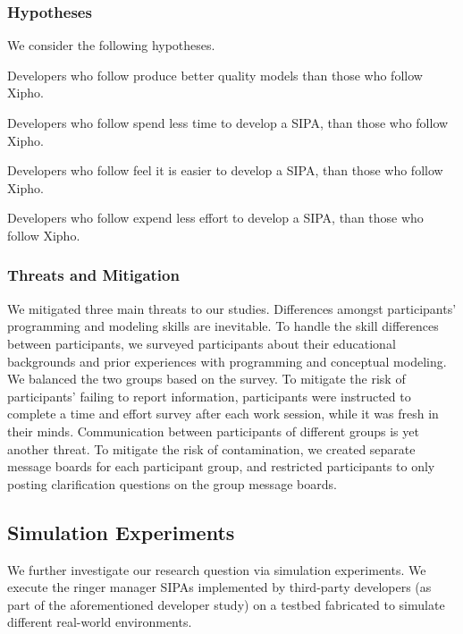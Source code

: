 \subsubsection*{Hypotheses}

We consider the following hypotheses.

\bhypothesis

\item Developers who follow \frameworkA produce better quality models 
than those who follow Xipho.  

\item Developers who follow \frameworkA spend less time to develop 
a SIPA, than those who follow Xipho.

\item Developers who follow \frameworkA feel it is easier to develop 
a SIPA, than those who follow Xipho.

\item Developers who follow \frameworkA expend less effort to develop 
a SIPA, than those who follow Xipho.

\ehypothesis

\subsubsection*{Threats and Mitigation}

We mitigated three main threats to our studies. Differences amongst
participants' programming and modeling skills are inevitable. To handle
the skill differences between participants, we surveyed participants
about their educational backgrounds and prior experiences with
programming and conceptual modeling. We balanced the two groups based on
the survey. To mitigate the risk of participants' failing to report information,
participants were instructed to complete a time and effort survey after
each work session, while it was fresh in their minds. Communication
between participants of different groups is yet another threat. To
mitigate the risk of contamination, we created separate message boards for each
participant group, and restricted participants to only posting
clarification questions on the group message boards.



\subsection{Simulation Experiments}
\label{sec:arnor-simulation}

We further investigate our research question via simulation experiments.
We execute the ringer manager SIPAs implemented by third-party
developers (as part of the aforementioned developer study) on a testbed
fabricated to simulate different real-world environments.



